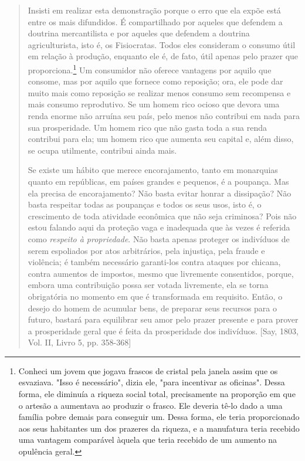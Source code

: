 \documentclass[12pt]{article}
\begin{document}
\begin{quote}
Insisti em realizar esta demonstração porque o erro que ela expõe está entre os mais difundidos. É compartilhado por aqueles que defendem a doutrina mercantilista e por aqueles que defendem a doutrina agriculturista, isto é, os Fisiocratas. Todos eles consideram o consumo útil em relação à produção, enquanto ele é, de fato, útil apenas pelo prazer que proporciona.\footnote{Conheci um jovem que jogava frascos de cristal pela janela assim que os esvaziava. "Isso é necessário", dizia ele, "para incentivar as oficinas". Dessa forma, ele diminuía a riqueza social total, precisamente na proporção em que o artesão a aumentava ao produzir o frasco. Ele deveria tê-lo dado a uma família pobre demais para conseguir um. Dessa forma, ele teria proporcionado aos seus habitantes um dos prazeres da riqueza, e a manufatura teria recebido uma vantagem comparável àquela que teria recebido de um aumento na opulência geral.} Um consumidor não oferece vantagens por aquilo que consome, mas por aquilo que fornece como reposição; ora, ele pode dar muito mais como reposição se realizar menos consumo sem recompensa e mais consumo reprodutivo. Se um homem rico ocioso que devora uma renda enorme não arruína seu país, pelo menos não contribui em nada para sua prosperidade. Um homem rico que não gasta toda a sua renda contribui para ela; um homem rico que aumenta seu capital e, além disso, se ocupa utilmente, contribui ainda mais.

Se existe um hábito que merece encorajamento, tanto em monarquias quanto em repúblicas, em países grandes e pequenos, é a poupança. Mas ela precisa de encorajamento? Não basta evitar honrar a dissipação? Não basta respeitar todas as poupanças e todos os seus usos, isto é, o crescimento de toda atividade econômica que não seja criminosa? Pois não estou falando aqui da proteção vaga e inadequada que às vezes é referida como \textit{respeito à propriedade}. Não basta apenas proteger os indivíduos de serem espoliados por atos arbitrários, pela injustiça, pela fraude e violência; é também necessário garanti-los contra ataques por chicana, contra aumentos de impostos, mesmo que livremente consentidos, porque, embora uma contribuição possa ser votada livremente, ela se torna obrigatória no momento em que é transformada em requisito. Então, o desejo do homem de acumular bens, de preparar seus recursos para o futuro, bastará para equilibrar seu amor pelo prazer presente e para prover a prosperidade geral que é feita da prosperidade dos indivíduos. [Say, 1803, Vol. II, Livro 5, pp. 358-368]
\end{quote}
\end{document}
